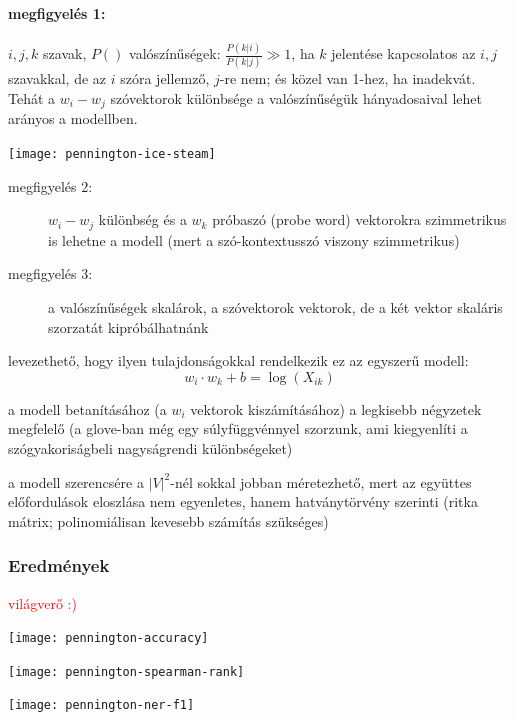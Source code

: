 \documentclass{beamer}
\begin{document}
\begin{frame}
\paragraph{megfigyelés 1:}
\(i, j, k\) szavak, \(P()\) valószínűségek: \(\frac{P(k|i)}{P(k|j)} \gg 1\), ha \(k\) jelentése kapcsolatos az \(i, j\) szavakkal, de az \(i\) szóra jellemző, \(j\)-re nem; és közel van 1-hez, ha inadekvát. Tehát a \(w_i-w_j\) szóvektorok különbsége a valószínűségük hányadosaival lehet arányos a modellben.

\medskip

\texttt{[image: pennington-ice-steam]}
\end{frame}

\begin{frame}
\begin{description}
\item[megfigyelés 2:]
\(w_i-w_j\) különbség és a \(w_k\) próbaszó (probe word) vektorokra szimmetrikus is lehetne a modell (mert a szó-kontextusszó viszony szimmetrikus)

\bigskip

\item[megfigyelés 3:]
a valószínűségek skalárok, a szóvektorok vektorok, de a két vektor skaláris szorzatát kipróbálhatnánk
\end{description}
\end{frame}

\begin{frame}
levezethető, hogy ilyen tulajdonságokkal rendelkezik ez az egyszerű modell:
\[ w_i \cdot w_k + b = \log(X_{ik}) \]

a modell betanításához (a \(w_i\) vektorok kiszámításához) a legkisebb négyzetek megfelelő
(a glove-ban még egy súlyfüggvénnyel szorzunk, ami kiegyenlíti a szógyakoriságbeli nagyságrendi különbségeket)

a modell szerencsére a \(|V|^2\)-nél sokkal jobban méretezhető, mert az együttes előfordulások eloszlása nem egyenletes, hanem hatványtörvény szerinti (ritka mátrix; polinomiálisan kevesebb számítás szükséges)
\end{frame}

\begin{frame}
\frametitle{Eredmények} 
\textcolor{red}{világverő :)}
\end{frame}
\begin{frame}
\texttt{[image: pennington-accuracy]}
\end{frame}
\begin{frame}
\texttt{[image: pennington-spearman-rank]}
\end{frame}
\begin{frame}
\texttt{[image: pennington-ner-f1]}
\end{frame}
\end{document}
